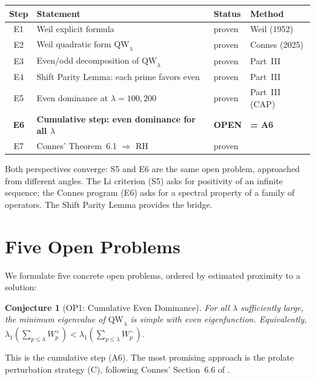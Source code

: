 \documentclass[12pt,a4paper]{article}
\newtheorem{conjecture}[theorem]{Conjecture}
\theoremstyle{definition}
\theoremstyle{remark}
\begin{document}
\begin{center}
\renewcommand{\arraystretch}{1.2}
\begin{tabular}{c|l|l|l}
\textbf{Step} & \textbf{Statement} & \textbf{Status} & \textbf{Method} \\\hline
E1 & Weil explicit formula & proven & Weil (1952) \\
E2 & Weil quadratic form $\mathrm{QW}_\lambda$ & proven & Connes (2025) \\
E3 & Even/odd decomposition of $\mathrm{QW}_\lambda$ & proven & Part~III \\
E4 & Shift Parity Lemma: each prime favors even & proven & Part~III \\
E5 & Even dominance at $\lambda = 100, 200$ & proven & Part~III (CAP) \\
\textbf{E6} & \textbf{Cumulative step: even dominance for all $\lambda$} & \textbf{OPEN} & \textbf{= A6} \\
E7 & Connes' Theorem~6.1 $\Rightarrow$ RH & proven & \cite{Connes2025}
\end{tabular}
\end{center}

\noindent Both perspectives converge: S5 and E6 are the same open problem, approached from different angles. The Li criterion (S5) asks for positivity of an infinite sequence; the Connes program (E6) asks for a spectral property of a family of operators. The Shift Parity Lemma provides the bridge.


\section{Five Open Problems}
\label{sec:open-problems}

We formulate five concrete open problems, ordered by estimated proximity to a solution:

\begin{conjecture}[OP1: Cumulative Even Dominance]
\label{conj:OP1}
For all $\lambda$ sufficiently large, the minimum eigenvalue of $\mathrm{QW}_\lambda$ is simple with even eigenfunction. Equivalently, $\lambda_1(\sum_{p \leq \lambda} W_p^+) < \lambda_1(\sum_{p \leq \lambda} W_p^-)$.
\end{conjecture}

This is the cumulative step (A6). The most promising approach is the prolate perturbation strategy (C), following Connes' Section~6.6 of \cite{Connes2025}.
\end{document}
